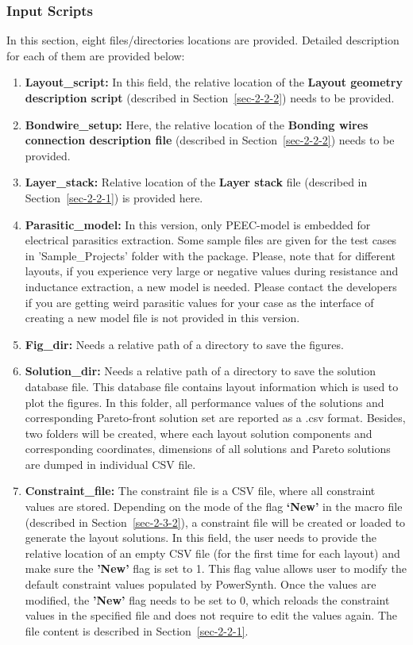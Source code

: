 \documentclass[11pt]{article}
\begin{document}
\subsubsection{Input Scripts}
\label{2-3-1}
In this section, eight files/directories locations are provided. Detailed description for each of them are provided below:
\begin{enumerate}
    \item \textbf{Layout\_script:} In this field, the relative location of the \textbf{Layout geometry description script} (described in Section~\ref{sec-2-2-2}) needs to be provided.
    \item\textbf{Bondwire\_setup:} Here, the relative location of the \textbf{Bonding wires connection description file} (described in Section~\ref{sec-2-2-2}) needs to be provided.
    \item \textbf{Layer\_stack:} Relative location of the \textbf{Layer stack} file (described in Section~\ref{sec-2-2-1}) is provided here.

    \item \textbf{Parasitic\_model:}
    In this version, only PEEC-model is embedded for electrical parasitics extraction. Some sample files are given for the test cases in 'Sample\_Projects' folder with the package. Please, note that for different layouts, if you experience very large or negative values during resistance and inductance extraction, a new model is needed. Please contact the developers if you are getting weird parasitic values for your case as the interface of creating a new model file is not provided in this version.
    
    \item \textbf{Fig\_dir:}
    Needs a relative path of a directory to save the figures.
    \item \textbf{Solution\_dir:}
    Needs a relative path of a directory to save the solution database file. This database file contains layout information which is used to plot the figures. In this folder, all performance values of the solutions and corresponding Pareto-front solution set are reported as a .csv format. Besides, two folders will be created, where each layout solution components and corresponding coordinates, dimensions of all solutions and Pareto solutions are dumped in individual CSV file.
    
    \item \textbf{Constraint\_file:}
    The constraint file is a CSV file, where all constraint values are stored. Depending on the mode of the flag \textbf{`New'} in the macro file (described in Section~\ref{sec-2-3-2}), a constraint file will be created or loaded to generate the layout solutions. In this field, the user needs to provide the relative location of an empty CSV file (for the first time for each layout) and make sure the \textbf{'New'} flag is set to 1. This flag value allows user to modify the default constraint values populated by PowerSynth. Once the values are modified, the \textbf{'New'} flag needs to be set to 0, which reloads the constraint values in the specified file and does not require to edit the values again. The file content is described in Section~\ref{sec-2-2-1}.
    

\end{enumerate}
\end{document}
